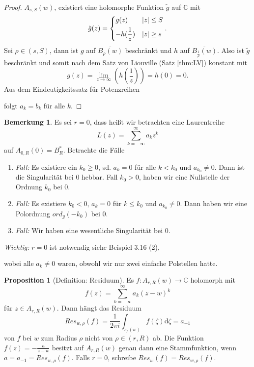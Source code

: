 \documentclass[11pt,titlepage]{article}
\theoremstyle{definition}
\newtheorem{proposition}[theorem]{Proposition}
\newtheorem{remark}{Bemerkung}
\theoremstyle{remark}
\begin{document}
\begin{proof}
		$A_{s,S}(w)$, existiert eine holomorphe Funktion $\tilde{g}$ auf $\mathbb{C}$ mit 
		\[ \tilde{g}(z)=\begin{dcases} g(z) & |z|\leq S \\ -h(\frac{1}{z}) & |z| \geq s \end{dcases}. \]
		Sei $\rho\in (s,S)$, dann ist $g$ auf $\overline{B_{\rho}(w)}$ beschränkt und $h$ auf 
		$\overline{B_{\frac{1}{\rho}}(w)}$. Also ist $\tilde{g}$ beschränkt und somit nach dem Satz von 
		Liouville (Satz \ref{thm:LV}) konstant mit 
		\[ g(z)=\lim_{z\to\infty}\left(h\left(\frac{1}{z}\right)\right)=h(0)=0. \]
		Aus dem Eindeutigkeitssatz für Potenzreihen
		
		
		folgt $a_k =b_k$ für alle $k$.
	\end{proof}
	
	\begin{remark}
		Es sei $r=0$, dass heißt wir betrachten eine Laurentreihe
		\[ L(z)=\sum_{k=-\infty}^{\infty} a_k z^k \]
		auf $A_{0,R}(0)=B_R^*$. Betrachte die Fälle
		\begin{enumerate}
			\item \textsl{Fall:} Es existiere ein $k_0\geq 0$, sd. $a_k=0$ für alle $k<k_0$ und $a_{k_0}\neq 0$. 
			Dann ist die Singularität bei $0$ hebbar. Fall $k_0 >0$, haben wir eine Nullstelle der Ordnung 
			$k_0$ bei $0$.
			
			\item \textsl{Fall:} Es existiere $k_0 <0$, $a_k=0$ für $k\leq k_0$ und $a_{k_0}\neq0$. Dann 
			haben wir eine Polordnung $ord_g (-k_0)$ bei $0$.
			
			\item \textsl{Fall:} Wir haben eine wesentliche Singularität bei $0$.
		\end{enumerate}
		\textsl{Wichtig:} $r=0$ ist notwendig siehe Beispiel 3.16 (2), 
		
		
		wobei alle $a_k\neq 0$ waren, obwohl wir nur zwei einfache Polstellen hatte.
	\end{remark}
	
	\begin{proposition}[Definition: Residuum]
		Es $f:A_{r,R}(w)\to\mathbb{C}$ holomorph mit
		\[ f(z)=\sum_{k=-\infty}^{\infty} a_k (z-w)^k \]
		für $z\in A_{r,R}(w)$. Dann hängt das Residuum
		\[ Res_{w,\rho}(f)=\frac{1}{2\pi i}\int_{s_{\rho}(w)}f(\zeta)\mathrm{d}\zeta =a_{-1} \]
		von $f$ bei $w$ zum Radius $\rho$ nicht von $\rho\in (r,R)$ ab. Die Funktion $f(z)=-\frac{a}{z-w}$ 
		besitzt auf $A_{r,R}(w)$ genau dann eine Stammfunktion, wenn $a=a_{-1}=Res_{w,\rho}(f)$.
		Falls $r=0$, schreibe $Res_w(f)=Res_{w,\rho}(f)$.
	\end{proposition}
	
\end{document}
